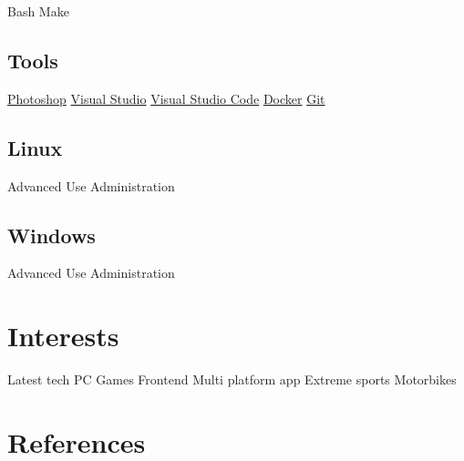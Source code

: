\documentclass[a4paper,final]{styles/deedy-resume}%
\newcommand{\mySep}{{\color{black!40!white}\textbullet{}}}
\newcommand{\mySmallSpace}{\vspace{3pt}}
\begin{document}
\begin{minipage}[t]{0.33\textwidth}
	{\small
		Bash \mySep{}
		Make
		\mySmallSpace{}
	}

	\sectionspace %

	\subsection{Tools}
	{\small
		\href{http://www.adobe.com/products/photoshop.html}{Photoshop} \mySep{}
		\href{https://www.visualstudio.com/}{Visual Studio} \mySep{}
		\href{https://code.visualstudio.com/}{Visual Studio Code} \mySep{}
		\href{https://www.docker.com/}{Docker} \mySep{}
		\href{https://git-scm.com/}{Git}
	}

	\sectionspace %

	\subsection{Linux}
	Advanced Use \mySep{}
	Administration

	\sectionspace %

	\subsection{Windows}
	Advanced Use \mySep{}
	Administration

	\section{Interests}
	{Latest tech} \mySep{}
	{PC Games} \mySep{}
	{Frontend} \mySep{}
	{Multi platform app} \mySep{}
	{Extreme sports} \mySep{}
	{Motorbikes}
	\section{References}

	\href{https://github.com/rajzik}{}

	\sectionspace %



\end{minipage} %
\end{document}
